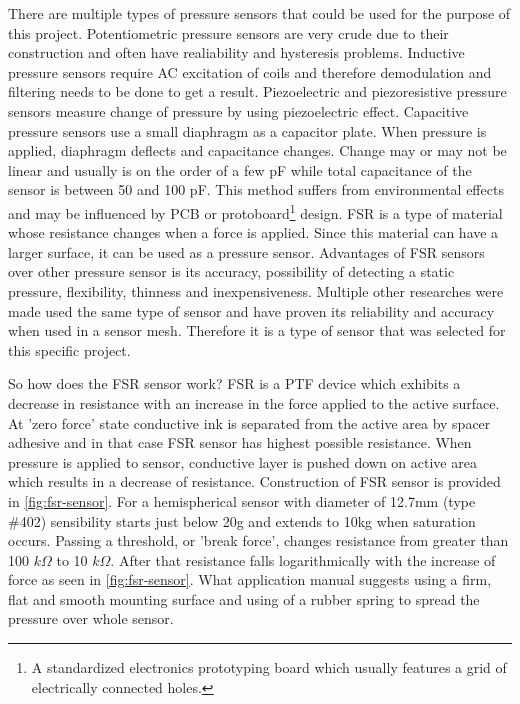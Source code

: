 There are multiple types of pressure sensors that could be used for the purpose of this project\cite{pressure_sensors}. Potentiometric pressure sensors are very crude due to their construction and often have realiability and hysteresis problems. Inductive pressure sensors require \ac{AC} excitation of coils and therefore demodulation and filtering needs to be done to get a result. Piezoelectric and piezoresistive pressure sensors measure change of pressure by using piezoelectric effect. Capacitive pressure sensors use a small diaphragm as a capacitor plate. When pressure is applied, diaphragm deflects and capacitance changes. Change may or may not be linear and usually is on the order of a few \ac{pF} while total capacitance of the sensor is between 50 and 100 \ac{pF}. This method suffers from environmental effects and may be influenced by \ac{PCB} or protoboard\footnote{A standardized electronics prototyping board which usually features a grid of electrically connected holes.} design. \ac{FSR} is a type of material whose resistance changes when a force is applied. Since this material can have a larger surface, it can be used as a pressure sensor. Advantages of \ac{FSR} sensors over other pressure sensor is its accuracy, possibility of detecting a static pressure, flexibility, thinness and inexpensiveness. Multiple other researches were made used the same type of sensor and have proven its reliability and accuracy when used in a sensor mesh\cite{pillow_system_1}\cite{pillow_system_2}\cite{apnea_low_cost}. Therefore it is a type of sensor that was selected for this specific project.

So how does the \ac{FSR} sensor work? \ac{FSR} is a \ac{PTF} device which exhibits a decrease in resistance with an increase in the force applied to the active surface\cite{fsr_guide}. At 'zero force' state conductive ink is separated from the active area by spacer adhesive and in that case \ac{FSR} sensor has highest possible resistance. When pressure is applied to sensor, conductive layer is pushed down on active area which results in a decrease of resistance. Construction of FSR sensor is provided in \ref{fig:fsr-sensor}. For a hemispherical sensor with diameter of 12.7mm (type \#402) sensibility starts just below 20g and extends to 10kg when saturation occurs. Passing a threshold, or 'break force', changes resistance from greater than 100 $k\Omega$ to 10 $k\Omega$. After that resistance falls logarithmically with the increase of force as seen in \ref{fig:fsr-sensor}. What application manual\cite{fsr_guide} suggests using a firm, flat and smooth mounting surface and using of a rubber spring to spread the pressure over whole sensor.

